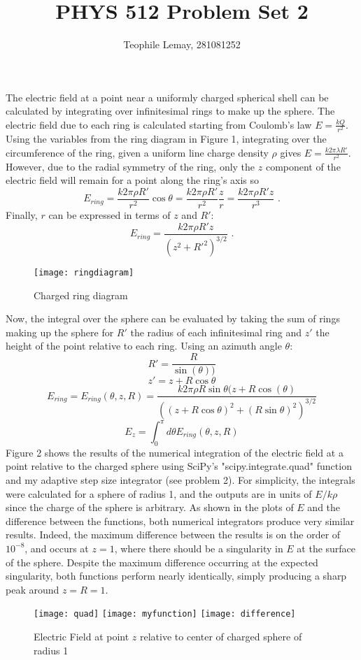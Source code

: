 \documentclass{article}
\title{PHYS 512 Problem Set 2}
\author{Teophile Lemay, 281081252}
\date{}
\newcommand{\<}[1]{\left\langle #1 \right\rangle }
\begin{document}
	\maketitle
	
\section{}
The electric field at a point near a uniformly charged spherical shell can be calculated by integrating over infinitesimal rings to make up the sphere. The electric field due to each ring is calculated starting from Coulomb's law $E = \frac{kQ}{r^2}$. Using the variables from the ring diagram in Figure 1, integrating over the circumference of the ring, given a uniform line charge density $\rho$ gives $E = \frac{k2\pi \lambda R'}{r^2}$. However, due to the radial symmetry of the ring, only the $z$ component of the electric field will remain for a point along the ring's axis so
\[E_{ring} = \frac{k2\pi\rho R'}{r^2} \cos{\theta} = \frac{k2\pi\rho R'}{r^2}\frac{z}{r} = \frac{k2\pi\rho R'z}{r^3}\text{ .}\]
Finally, $r$ can be expressed in terms of $z$ and $R'$:
\[E_{ring} = \frac{k2\pi\rho R'z}{\left(z^2 + R'^2\right)^{3/2}} \text{ .}\]
\begin{figure}[h]
	\caption{Charged ring diagram}
	\centering
	\texttt{[image: ringdiagram]}
\end{figure}
Now, the integral over the sphere can be evaluated by taking the sum of rings making up the sphere for $R'$ the radius of each infinitesimal ring and $z'$ the height of the point relative to each ring. Using an azimuth angle $\theta$:
\[R' = \frac{R}{\sin(\theta))} \]
\[z' = z + R\cos\theta\]
\[E_{ring} = E_{ring}(\theta, z, R) = \frac{k2\pi\rho R\sin{\theta}(z+R\cos(\theta)}{\left((z+R\cos{\theta})^2 + (R\sin{\theta})^2\right)^{3/2}}\]
\[E_z = \int_{0}^{\pi}  d\theta E_{ring}(\theta, z, R)\]
Figure 2 shows the results of the numerical integration of the electric field at a point relative to the charged sphere using SciPy's "scipy.integrate.quad" function and my adaptive step size integrator (see problem 2). For simplicity, the integrals were calculated for a sphere of radius 1, and the outputs are in units of $E/k\rho$ since the charge of the sphere is arbitrary. As shown in the plots of $E$ and the difference between the functions, both numerical integrators produce very similar results. Indeed, the maximum difference between the results is on the order of $10^{-8}$, and occurs at $z=1$, where there should be a singularity in $E$ at the surface of the sphere. Despite the maximum difference occurring at the expected singularity, both functions perform nearly identically, simply producing a sharp peak around $z=R=1$.
\begin{figure}[h]
	\caption{Electric Field at point $z$ relative to center of charged sphere of radius 1}
	\centering
	\texttt{[image: quad]}
	\texttt{[image: myfunction]}
	\texttt{[image: difference]}
\end{figure}
\end{document}
